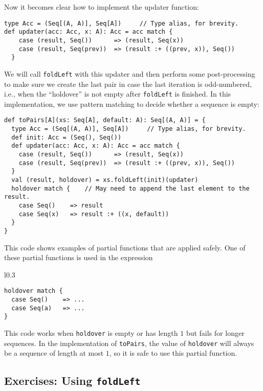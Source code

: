 Now it becomes clear how to implement the updater function:
\begin{lstlisting}
type Acc = (Seq[(A, A)], Seq[A])     // Type alias, for brevity.
def updater(acc: Acc, x: A): Acc = acc match {
    case (result, Seq())      => (result, Seq(x))
    case (result, Seq(prev))  => (result :+ ((prev, x)), Seq())
  }
\end{lstlisting}
We will call \lstinline!foldLeft! with this updater and then perform
some post-processing to make sure we create the last pair in case
the last iteration is odd-numbered, i.e., when the \textsf{``}holdover\textsf{''}
is not empty after \lstinline!foldLeft! is finished. In this implementation,
we use pattern matching to decide whether a sequence is empty:
\begin{lstlisting}
def toPairs[A](xs: Seq[A], default: A): Seq[(A, A)] = {
  type Acc = (Seq[(A, A)], Seq[A])     // Type alias, for brevity.
  def init: Acc = (Seq(), Seq())
  def updater(acc: Acc, x: A): Acc = acc match {
    case (result, Seq())      => (result, Seq(x))
    case (result, Seq(prev))  => (result :+ ((prev, x)), Seq())
  }
  val (result, holdover) = xs.foldLeft(init)(updater)
  holdover match {    // May need to append the last element to the result.
    case Seq()    => result
    case Seq(x)   => result :+ ((x, default))
  }
}
\end{lstlisting}
This code shows examples of partial functions that are applied safely.
One of these partial functions is used in the expression

\begin{wrapfigure}{l}{0.3\columnwidth}%
\vspace{-0.95\baselineskip}
\begin{lstlisting}
holdover match {
  case Seq()    => ...
  case Seq(a)   => ...
}
\end{lstlisting}

\vspace{-1.5\baselineskip}
\end{wrapfigure}%

\noindent This code works when \lstinline!holdover! is empty or has
length $1$ but fails for longer sequences. In the implementation
of \lstinline!toPairs!, the value of \lstinline!holdover! will always
be a sequence of length at most $1$, so it is safe to use this partial
function.

\subsection{Exercises: Using \texttt{foldLeft}}

